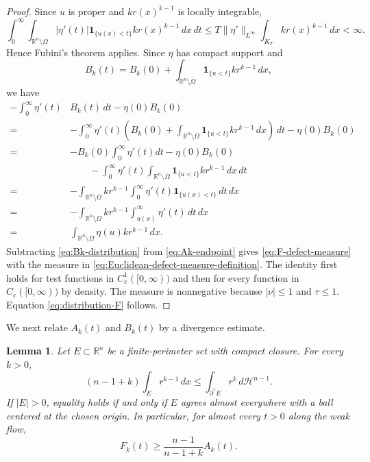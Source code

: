 \documentclass[11pt,reqno]{amsart}
\numberwithin{equation}{section}
\newtheorem{lemma}[theorem]{Lemma}
\theoremstyle{definition}
\newcommand{\R}{\mathbb R}
\newcommand{\Om}{\Omega}
\newcommand{\calH}{\mathcal H}
\begin{document}
\begin{proof}
Since $u$ is proper and $kr(x)^{k-1}$ is locally integrable,
\begin{equation*}
    \int_0^\infty\int_{\mathbb R^n\setminus\Omega}
    |\eta'(t)|\mathbf 1_{\{u(x)<t\}}kr(x)^{k-1}\,dx\,dt
    \leq
    T\|\eta'\|_{L^\infty}\int_{K_T}kr(x)^{k-1}\,dx<\infty.
\end{equation*}
Hence Fubini's theorem applies. Since $\eta$ has compact support and
\begin{equation*}
    B_k(t)=B_k(0)
      +\int_{\R^n\setminus\overline\Om}
        \mathbf 1_{\{u<t\}}kr^{k-1}\,dx,
\end{equation*}
we have 
\begin{align}\label{eq:Bk-distribution}
 -\int_0^\infty\eta'(t)&B_k(t)\,dt-\eta(0)B_k(0)\nonumber\\
 =&-\int_0^\infty\eta'(t)\left(B_k(0)
      +\int_{\R^n\setminus\overline\Om}
        \mathbf 1_{\{u<t\}}kr^{k-1}\,dx\right)\,dt-\eta(0)B_k(0)\nonumber\\
=&-B_k(0)\int_0^\infty\eta'(t)dt-\eta(0)B_k(0)\nonumber\\
&\qquad -\int_0^\infty\eta'(t)\int_{\R^n\setminus\overline\Om}
        \mathbf 1_{\{u<t\}}kr^{k-1}\,dx \,dt\nonumber\\
 =&-\int_{\mathbb R^n\setminus\Omega}kr^{k-1}
   \int_0^\infty\eta'(t)\mathbf 1_{\{u(x)<t\}}\,dt\,dx\nonumber\\
 =&-\int_{\mathbb R^n\setminus\Omega}kr^{k-1}
   \int_{u(x)}^\infty\eta'(t)\,dt\,dx\nonumber\\
 =&\int_{\mathbb R^n\setminus\Omega}
   \eta(u)kr^{k-1}\,dx.
\end{align}
Subtracting \eqref{eq:Bk-distribution} from \eqref{eq:Ak-endpoint} gives \eqref{eq:F-defect-measure} with the measure in \eqref{eq:Euclidean-defect-measure-definition}.   The identity first holds for test functions in $C_c^1([0,\infty))$ and then for every function in $C_c([0,\infty))$ by density.  The measure is nonnegative because $|\nu|\leq1$ and $\tau\leq1$.  Equation \eqref{eq:distribution-F} follows.
\end{proof}

We next relate $A_k(t)$ and $B_k(t)$ by a divergence estimate.

\begin{lemma}\label{lem:divergence}
Let $E\subset\R^n$ be a finite-perimeter set with compact closure.  For every $k>0$,
\begin{equation}\label{eq:divergence-estimate}
    (n-1+k)\int_E r^{k-1}\,dx
    \leq
    \int_{\partial^*E}r^k\,d\calH^{n-1}.
\end{equation}
If $|E|>0$, equality holds if and only if $E$ agrees almost everywhere with a ball centered at the chosen origin. In particular, for almost every $t>0$ along the weak flow,
\begin{equation}\label{eq:B-vs-A}
    F_k(t)\geq\frac{n-1}{n-1+k}A_k(t).
\end{equation}
\end{lemma}
\end{document}
